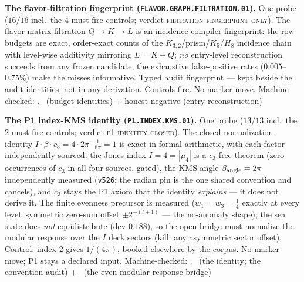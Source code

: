\documentclass[11pt,a4paper]{article}
\newcommand{\cthree}{c_3}
\theoremstyle{definition}
\begin{document}
\par\smallskip\noindent\textbf{The flavor-filtration fingerprint
(\texttt{FLAVOR.GRAPH.FILTRATION.01}).}
One probe ($16/16$ incl.\ the $4$ must-fire controls; verdict
\textsc{filtration-fingerprint-only}).  The flavor-matrix
filtration $Q\to K\to L$ is an incidence-compiler fingerprint: the
row budgets are exact, order-exact counts of the
$K_{3,2}$/prism/$K_5$/$H_8$ incidence chain with level-wise
additivity mirroring $L=K+Q$; \emph{no} entry-level reconstruction
succeeds from any frozen candidate; the exhaustive false-positive
rates ($0.005$--$0.75\%$) make the misses informative.  Typed
audit fingerprint --- kept beside the audit identities, not in any
derivation.  Controls fire.  No marker move.
Machine-checked: .
\mE\ (budget identities) $+$ honest negative (entry
reconstruction)
\par\smallskip

\par\smallskip\noindent\textbf{The P1 index-KMS identity
(\texttt{P1.INDEX.KMS.01}).}
One probe ($13/13$ incl.\ the $2$ must-fire controls; verdict
\textsc{p1-identity-closed}).  The closed normalization identity
$I\cdot\beta\cdot\cthree=4\cdot2\pi\cdot\tfrac1{8\pi}=1$ is exact
in formal arithmetic, with each factor independently sourced: the
Jones index $I=4=|\mu_4|$ is a $\cthree$-free theorem (zero
occurrences of $\cthree$ in all four sources, gated), the KMS angle
$\beta_{\rm angle}=2\pi$ independently measured (\texttt{v526}; the
radian pin is the one shared convention and cancels), and
$\cthree$ stays the P1 axiom that the identity \emph{explains} ---
it does not derive it.  The finite evenness precursor is measured
($w_1=w_3=\tfrac14$ exactly at every level, symmetric zero-sum
offset $\pm2^{-(l+1)}$ --- the no-anomaly shape); the sea state
does \emph{not} equidistribute (dev $0.188$), so the open bridge
must normalize the modular response over the $I$ deck sectors
(kill: any asymmetric sector offset).  Control: index $2$ gives
$1/(4\pi)$, booked elsewhere by the corpus.  No marker move; P1
stays a declared input.
Machine-checked: .
\mE\ (the identity; the convention audit) $+$ \mO\ (the even
modular-response bridge)
\par\smallskip
\end{document}
